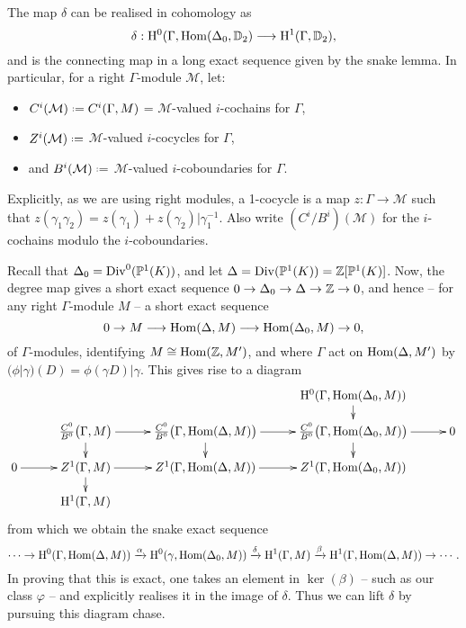 \documentclass[a4paper,11pt]{article}
\numberwithin{equation}{section}
\begin{document}
The map $\delta$ can be realised in cohomology as 
\[
\delta : \mathrm{H}^0(\Gamma,\mathrm{Hom}(\Delta_0,\mathbb{D}_2) \longrightarrow \mathrm{H}^1(\Gamma,\mathbb{D}_2),
\]
and is the connecting map in a long exact sequence given by the snake lemma. In particular, for a right $\Gamma$-module $\mathcal{M}$, let:
\begin{itemize}
	\item $C^i(\mathcal{M}) \defeq C^i(\Gamma,M)$ = $\mathcal{M}$-valued $i$-cochains for $\Gamma$,
	\item $Z^i(\mathcal{M}) \defeq$ $\mathcal{M}$-valued $i$-cocycles for $\Gamma$,
	\item and $B^i(\mathcal{M}) \defeq$ $\mathcal{M}$-valued $i$-coboundaries for $\Gamma$. 
\end{itemize}
Explicitly, as we are using right modules, a 1-cocycle is a map $z : \Gamma \to \mathcal{M}$ such that $z(\gamma_1\gamma_2) = z(\gamma_1) + z(\gamma_2)|\gamma_1^{-1}$. Also write $(C^i/B^i)(\mathcal{M})$ for the $i$-cochains modulo the $i$-coboundaries.

Recall that $\Delta_0 = \mathrm{Div}^0(\mathbb{P}^1(K))$, and let $\Delta = \mathrm{Div}(\mathbb{P}^1(K)) = \mathbb{Z}[\mathbb{P}^1(K)]$. Now, the degree map gives a short exact sequence $0 \to \Delta_0 \to \Delta \to \mathbb{Z} \to 0$, and hence -- for any right $\Gamma$-module $M$ -- a short exact sequence
\[
	0 \to M \longrightarrow \mathrm{Hom}(\Delta,M) \longrightarrow \mathrm{Hom}(\Delta_0,M) \to 0,
\]
of $\Gamma$-modules, identifying $M \cong \mathrm{Hom}(\mathbb{Z},M')$, and where $\Gamma$ act on $\mathrm{Hom}(\Delta,M')$ by $(\phi|\gamma)(D) = \phi(\gamma D)|\gamma$. This gives rise to a diagram
\[
	\xymatrix@C=10mm@R=4mm{
		& & & \h^0(\Gamma,\Hom(\Delta_0,M))\ar[d] &\\
			 & \frac{C^0}{B^0}\big(\Gamma,M\big)\ar[r]\ar[d]   & \frac{C^0}{B^0}\big(\Gamma,\Hom(\Delta,M)\big)\ar[r]\ar[d] &  \frac{C^0}{B^0}\big(\Gamma,\Hom(\Delta_0,M)\big)\ar[r]\ar[d] &0\\
	0 \ar[r]  & Z^1(\Gamma,M)  \ar[r]\ar[d] & Z^1(\Gamma,\Hom(\Delta,M))  \ar[r] & Z^1(\Gamma,\Hom(\Delta_0,M)) &\\
	& \h^1(\Gamma,M) & & & \\
}
\]
from which we obtain the snake exact sequence
\[
\cdots \to \mathrm{H}^0(\Gamma,\mathrm{Hom}(\Delta,M)) \xrightarrow{\alpha} \mathrm{H}^0(\gamma,\mathrm{Hom}(\Delta_0,M)) \xrightarrow{\delta} \mathrm{H}^1(\Gamma,M) \xrightarrow{\beta} \mathrm{H}^1(\Gamma,\mathrm{Hom}(\Delta,M)) \to \cdots.
\]
In proving that this is exact, one takes an element in $\ker(\beta)$ -- such as our class $\varphi$ -- and explicitly realises it in the image of $\delta$. Thus we can lift $\delta$ by pursuing this diagram chase.
\end{document}

